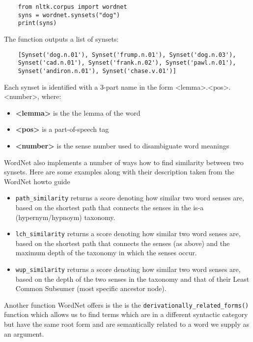 \begin{lstlisting}
	from nltk.corpus import wordnet
	syns = wordnet.synsets("dog")
	print(syns)
\end{lstlisting}

The function outputs a list of synsets:

\begin{lstlisting}
	[Synset('dog.n.01'), Synset('frump.n.01'), Synset('dog.n.03'), 
	Synset('cad.n.01'), Synset('frank.n.02'), Synset('pawl.n.01'), 
	Synset('andiron.n.01'), Synset('chase.v.01')]
\end{lstlisting}

Each synset is identified with a 3-part name in the form <lemma>.<pos>.<number>, where:
\begin{itemize}
\item \textbf{<lemma>} is the the lemma of the word
\item \textbf{<pos>} is a part-of-speech tag
\item \textbf{<number>} is the sense number used to disambiguate word meanings\cite{nltk_docs}
\end{itemize}

WordNet also implements a number of ways how to find similarity between two synsets. Here are some examples along with their description taken from the WordNet howto guide\cite{wordnet_howto} 

\begin{itemize}
\item \texttt{path\_similarity} returns a score denoting how similar two word senses are, based on the shortest path that connects the senses in the is-a (hypernym/hypnoym) taxonomy.

\item \texttt{lch\_similarity} returns a score denoting how similar two word senses are, based on the shortest path that connects the senses (as above) and the maximum depth of the taxonomy in which the senses occur.

\item \texttt{wup\_similarity} returns a score denoting how similar two word senses are, based on the depth of the two senses in the taxonomy and that of their Least Common Subsumer (most specific ancestor node). 
\end{itemize}

Another function WordNet offers is the is the \texttt{derivationally\_related\_forms()} function which allows us to find terms which are in a different syntactic category but have the same root form and are semantically related to a word we supply as an argument.

